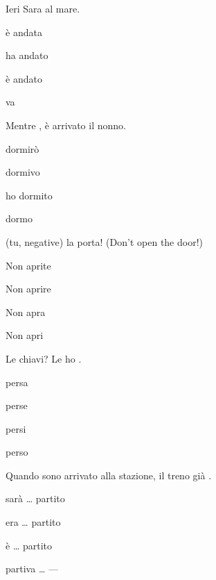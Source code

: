 \documentclass[11pt,a4paper,twoside,openright]{book}
\newcommand{\blank}{\underline{\hspace{2.6cm}}}
\begin{document}
\begin{exercises}
\item\label{ex:diag-11}\relax Ieri Sara \blank{} al mare.\par\nopagebreak\begin{options}
\item\relax è andata
\item\relax ha andato
\item\relax è andato
\item\relax va
\end{options}
\item\label{ex:diag-12}\relax Mentre \blank{}, è arrivato il nonno.\par\nopagebreak\begin{options}
\item\relax dormirò
\item\relax dormivo
\item\relax ho dormito
\item\relax dormo
\end{options}
\item\label{ex:diag-13}\relax (tu, negative) \blank{} la porta! (Don’t open the door!)\par\nopagebreak\begin{options}
\item\relax Non aprite
\item\relax Non aprire
\item\relax Non apra
\item\relax Non apri
\end{options}
\item\label{ex:diag-14}\relax Le chiavi? Le ho \blank{}.\par\nopagebreak\begin{options}
\item\relax persa
\item\relax perse
\item\relax persi
\item\relax perso
\end{options}
\item\label{ex:diag-15}\relax Quando sono arrivato alla stazione, il treno \blank{} già \blank{}.\par\nopagebreak\begin{options}
\item\relax sarà … partito
\item\relax era … partito
\item\relax è … partito
\item\relax partiva … —
\end{options}

\end{exercises}
\end{document}
